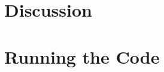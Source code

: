 \documentclass[10pt]{article}
\begin{document}
\section{Discussion}
\section{Running the Code} 
\end{document}
